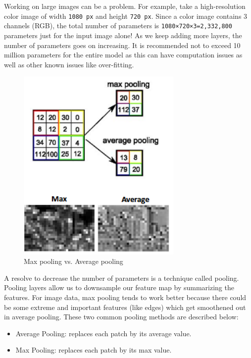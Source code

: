 \documentclass[twocolumn]{article}
\begin{document}
Working on large images can be a problem. For example, take a high-resolution 
color image of width \texttt{1080 px} and height \texttt{720 px}. Since a 
color image contains 3 channels (RGB), the total number of parameters is 
\texttt{1080×720×3=2,332,800} parameters just for the input image alone! As we 
keep adding more layers, the number of parameters goes on increasing. It is 
recommended not to exceed 10 million parameters for the entire model as this 
can have computation issues as well as other known issues like over-fitting.

\begin{figure}[h]
\centering
\includegraphics[width=8cm]{./figures/max pooling vs. average pooling}
\caption{Max pooling vs. Average pooling}
\end{figure}

A resolve to decrease the number of parameters is a technique called pooling. 
Pooling layers allow us to downsample our feature map by summarizing the 
features. For image data, max pooling tends to work better because there could 
be some extreme and important features (like edges) which get smoothened out 
in average pooling. These two common pooling methods are described below: 
\begin{itemize}
	\item Average Pooling: replaces each patch by its average value.
	\item Max Pooling: replaces each patch by its max value.
\end{itemize}
\end{document}
